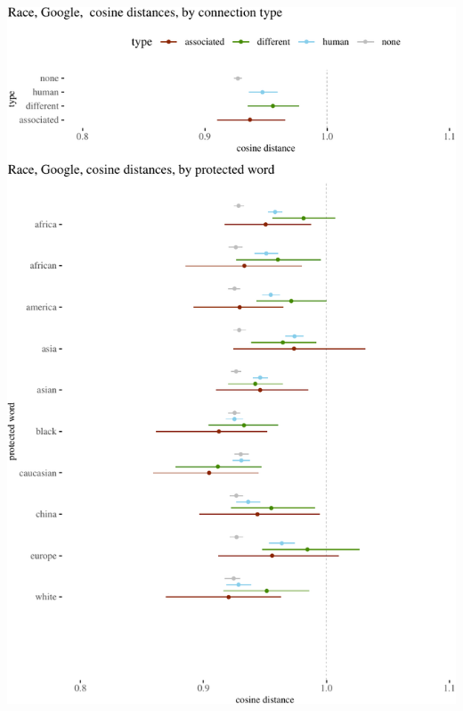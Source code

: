\documentclass{clv3}
\begin{document}
\begin{center}\includegraphics[width=1\linewidth]{figures/resultsRaceGooglea} \end{center}
\end{document}
